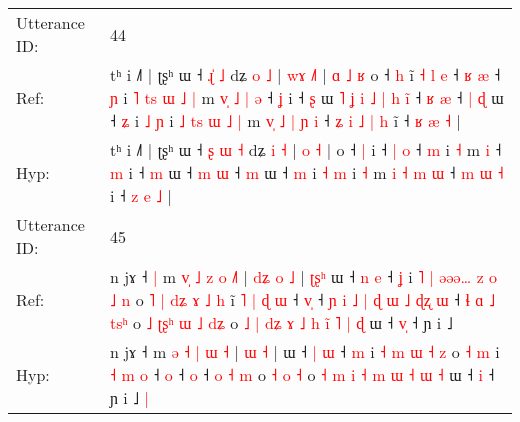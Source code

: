 \documentclass[10pt]{article}
\DeclareRobustCommand{\hl}[1]{{\textcolor{red}{#1}}}
\begin{document}
\begin{longtable}{ll}
 \\
\midrule
Utterance ID: & 44 \\
Ref: & tʰ i ˩˥ | ʈʂʰ ɯ ˧ \hl{}\hl{ɻ}\hl{̍} \hl{˩} dʑ \hl{o} \hl{˩} | \hl{w}\hl{ɤ} \hl{˩}\hl{˥} |\hl{ }\hl{ɑ}\hl{ }\hl{˩}\hl{ }\hl{ʁ} o ˧ \hl{h} i\hl{̃}\hl{ }\hl{˧}\hl{ }\hl{l}\hl{ }\hl{e} ˧ \hl{ʁ} \hl{æ} ˧ \hl{ɲ} i\hl{ }\hl{˥}\hl{ }\hl{t}\hl{s}\hl{ }\hl{ɯ}\hl{ }\hl{˩} \hl{|} m\hl{ }\hl{v}\hl{̩}\hl{ }\hl{˩}\hl{ }\hl{|} \hl{ə} ˧ \hl{ʝ} i ˧ \hl{ʂ} ɯ\hl{ }\hl{˥}\hl{ }\hl{ʝ}\hl{ }\hl{i}\hl{ }\hl{˩}\hl{ }\hl{|}\hl{ }\hl{h}\hl{ }\hl{i}\hl{̃} ˧ \hl{ʁ} \hl{æ} ˧\hl{ }\hl{|} \hl{ɖ} ɯ ˧ \hl{ʑ} i \hl{˩} \hl{ɲ} i\hl{ }\hl{˩}\hl{ }\hl{t}\hl{s}\hl{ }\hl{ɯ}\hl{ }\hl{˩} \hl{|} m\hl{ }\hl{v}\hl{̩} \hl{˩} \hl{|} \hl{ɲ} \hl{i} ˧\hl{ }\hl{ʑ}\hl{ }\hl{i} \hl{˩} \hl{|} \hl{h} i\hl{̃} ˧ \hl{ʁ} \hl{æ} \hl{˧} |
 \\
Hyp: & tʰ i ˩˥ | ʈʂʰ ɯ ˧ \hl{ʂ}\hl{ }\hl{ɯ} \hl{˧} dʑ \hl{i} \hl{˧} | \hl{}\hl{o} \hl{}\hl{˧} |\hl{}\hl{}\hl{}\hl{}\hl{}\hl{} o ˧ \hl{|} i\hl{}\hl{}\hl{}\hl{}\hl{}\hl{}\hl{} ˧ \hl{|} \hl{o} ˧ \hl{m} i\hl{}\hl{}\hl{}\hl{}\hl{}\hl{}\hl{}\hl{}\hl{} \hl{˧} m\hl{}\hl{}\hl{}\hl{}\hl{}\hl{}\hl{} \hl{i} ˧ \hl{m} i ˧ \hl{m} ɯ\hl{}\hl{}\hl{}\hl{}\hl{}\hl{}\hl{}\hl{}\hl{}\hl{}\hl{}\hl{}\hl{}\hl{}\hl{} ˧ \hl{m} \hl{ɯ} ˧\hl{}\hl{} \hl{m} ɯ ˧ \hl{m} i \hl{˧} \hl{m} i\hl{}\hl{}\hl{}\hl{}\hl{}\hl{}\hl{}\hl{}\hl{} \hl{˧} m\hl{}\hl{}\hl{} \hl{i} \hl{˧} \hl{m} \hl{ɯ} ˧\hl{}\hl{}\hl{}\hl{} \hl{m} \hl{ɯ} \hl{˧} i\hl{} ˧ \hl{z} \hl{e} \hl{˩} |
 \\
\midrule
Utterance ID: & 45 \\
Ref: & n jɤ ˧\hl{ }\hl{|} m \hl{v}\hl{̩} \hl{˩} \hl{z} \hl{o} \hl{˩}\hl{˥} |\hl{ }\hl{d}\hl{ʑ} \hl{o} \hl{˩} |\hl{ }\hl{ʈ}\hl{ʂ}\hl{ʰ} ɯ ˧ \hl{n} \hl{e} ˧ \hl{ʝ} i\hl{ }\hl{˥}\hl{ }\hl{|} \hl{ə}\hl{ə}\hl{ə}\hl{…} \hl{z} \hl{o} \hl{˩} \hl{n} o\hl{ }\hl{˥}\hl{ }\hl{|}\hl{ }\hl{d}\hl{ʑ}\hl{ }\hl{ɤ} \hl{˩} \hl{h} i\hl{̃}\hl{ }\hl{˥} \hl{|} \hl{ɖ} \hl{ɯ} ˧ \hl{v}\hl{̩} ˧\hl{ }\hl{ɲ}\hl{ }\hl{i}\hl{ }\hl{˩}\hl{ }\hl{|}\hl{ }\hl{ɖ}\hl{ }\hl{ɯ}\hl{ }\hl{˩}\hl{ }\hl{ɖ}\hl{ʐ} \hl{ɯ} ˧\hl{ }\hl{ɬ} \hl{ɑ} \hl{˩} \hl{t}\hl{s}\hl{ʰ} o\hl{ }\hl{˩}\hl{ }\hl{ʈ}\hl{ʂ}\hl{ʰ} \hl{ɯ} \hl{˩} \hl{d}\hl{ʑ} o\hl{ }\hl{˩} \hl{|} \hl{d}\hl{ʑ} \hl{ɤ} \hl{˩} \hl{h} \hl{i}\hl{̃} \hl{˥} \hl{|} \hl{ɖ} ɯ ˧ \hl{v}\hl{̩} ˧ ɲ i ˩\hl{}\hl{}
 \\
Hyp: & n jɤ ˧\hl{}\hl{} m \hl{}\hl{ə} \hl{˧} \hl{|} \hl{ɯ} \hl{}\hl{˧} |\hl{}\hl{}\hl{} \hl{ɯ} \hl{˧} |\hl{}\hl{}\hl{}\hl{} ɯ ˧ \hl{|} \hl{ɯ} ˧ \hl{m} i\hl{}\hl{}\hl{}\hl{} \hl{}\hl{}\hl{}\hl{˧} \hl{m} \hl{ɯ} \hl{˧} \hl{z} o\hl{}\hl{}\hl{}\hl{}\hl{}\hl{}\hl{}\hl{}\hl{} \hl{˧} \hl{m} i\hl{}\hl{}\hl{} \hl{˧} \hl{m} \hl{o} ˧ \hl{}\hl{o} ˧\hl{}\hl{}\hl{}\hl{}\hl{}\hl{}\hl{}\hl{}\hl{}\hl{}\hl{}\hl{}\hl{}\hl{}\hl{}\hl{}\hl{} \hl{o} ˧\hl{}\hl{} \hl{o} \hl{˧} \hl{}\hl{}\hl{m} o\hl{}\hl{}\hl{}\hl{}\hl{}\hl{} \hl{˧} \hl{o} \hl{}\hl{˧} o\hl{}\hl{} \hl{˧} \hl{}\hl{m} \hl{i} \hl{˧} \hl{m} \hl{}\hl{ɯ} \hl{˧} \hl{ɯ} \hl{˧} ɯ ˧ \hl{}\hl{i} ˧ ɲ i ˩\hl{ }\hl{|}

\end{longtable}
\end{document}
